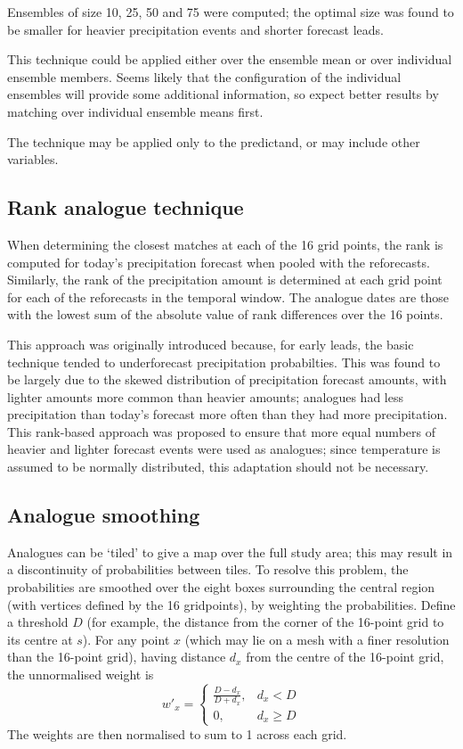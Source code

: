 \documentclass[10pt,fleqn]{article}
\begin{document}
Ensembles of size 10, 25, 50 and 75 were computed; the optimal size was found to be smaller for heavier precipitation events and shorter forecast leads.

This technique could be applied either over the ensemble mean or over individual ensemble members. Seems likely that the configuration of the individual ensembles will provide some additional information, so expect better results by matching over individual ensemble means first.

The technique may be applied only to the predictand, or may include other variables.


\subsection{Rank analogue technique}

When determining the closest matches at each of the 16 grid points, the rank is computed for today's precipitation forecast when pooled with the reforecasts. Similarly, the rank of the precipitation amount is determined at each grid point for each of the reforecasts in the temporal window. The analogue dates are those with the lowest sum of the absolute value of rank differences over the 16 points.

This approach was originally introduced because, for early leads, the basic technique tended to underforecast precipitation probabilties. This was found to be largely due to the skewed distribution of precipitation forecast amounts, with lighter amounts more common than heavier amounts; analogues had less precipitation than today's forecast more often than they had more precipitation. This rank-based approach was proposed to ensure that more equal numbers of heavier and lighter forecast events were used as analogues; since temperature is assumed to be normally distributed, this adaptation should not be necessary.

\subsection{Analogue smoothing}

Analogues can be `tiled' to give a map over the full study area; this may result in a discontinuity of probabilities between tiles. To resolve this problem, the probabilities are smoothed over the eight boxes surrounding the central region (with vertices defined by the 16 gridpoints), by weighting the probabilities. Define a threshold $D$ (for example, the distance from the corner of the 16-point grid to its centre at $s$). For any point $x$ (which may lie on a mesh with a finer resolution than the 16-point grid), having distance $d_x$ from the centre of the 16-point grid, the unnormalised weight is
\[ w'_x = \left\lbrace \begin{matrix}  \frac{D-d_x}{D+d_x}, & d_x < D \\ 0, & d_x \ge D \end{matrix} \right. \]
The weights are then normalised to sum to 1 across each grid.
\end{document}
